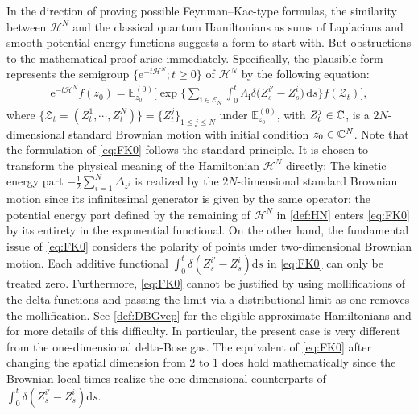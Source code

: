 \documentclass[12pt, twoside]{article}
\numberwithin{figure}{section}
\newcommand{\e}{{\mathrm e}}
\newcommand{\1}{\mathds 1}
\newcommand{\ms}{\mathscr}
\newcommand{\E}{{\mathbb E}}
\newcommand{\mc}{\mathcal}
\renewcommand{\d}{{\mathrm d}}
\newcommand{\2}{{\mathbf 1}}
\newcommand{\bi}{\mathbf i}
\newcommand{\CN}{{\mathbb C}^{\it N}}
\begin{document}
In the direction of proving possible Feynman--Kac-type formulas, the similarity between $\ms H^N$ and the classical quantum Hamiltonians as sums of Laplacians and smooth potential energy functions suggests a form to start with. But obstructions to the mathematical proof arise immediately. Specifically, the  plausible form represents the semigroup $\{\e^{-t\ms H^N};t\geq 0\}$ of $\ms H^N$ by the following equation: 
\begin{align}\label{eq:FK0}
{
\e^{-t\ms H^N}f(z_0)\;\mbox{=}\;
{\mathbb E}^{(0)}_{z_{0}} \Biggl[\exp \Biggl\{ \sum
_{\bi\in \mc E_N} 
\int _{0}^{t}\Lambda_\bi \delta\bigl(Z^{i
\prime}_{s}-Z^{i}_{s}
\bigr)\,\mathrm{d}s \Biggr\}f(\ms Z_{t}) \Biggr],
}
\end{align}
where $\{\ms Z_t=(Z^1_t,\cdots,Z^N_t)\}=\{Z^j_t\}_{1\leq j\leq N}$ under $\E^{(0)}_{z_0}$, with $Z^j_t\in\Bbb C$, is a $2N$-dimensional standard Brownian motion with initial condition $z_0\in \CN$. Note that the formulation of \eqref{eq:FK0} follows the standard principle. It is chosen to transform the physical meaning of the Hamiltonian $\ms H^N$ directly: The kinetic energy part $ -\frac{1}{2}\sum_{i=1}^N\Delta_{z^i}$ is realized by the $2N$-dimensional standard Brownian motion since its infinitesimal generator is given by the same operator; the potential energy part defined by the remaining of $\ms H^N$ in \eqref{def:HN} enters \eqref{eq:FK0} by its entirety in the exponential functional. On the other hand, the fundamental issue of \eqref{eq:FK0} considers the polarity of points under two-dimensional Brownian motion. Each additive functional $\int_0^t \delta(Z^{i\prime}_s-Z^i_s)\d s$ in \eqref{eq:FK0} can  only be treated zero. Furthermore, \eqref{eq:FK0} cannot be justified by using mollifications of the delta functions and passing the limit via a distributional limit as one removes the mollification. See \eqref{def:DBGvep} for the eligible approximate Hamiltonians and \cite[pp.137--138]{C:DBG} for more details of this difficulty. In particular, the present case is very different from the one-dimensional delta-Bose gas. The equivalent of \eqref{eq:FK0} after changing the spatial dimension from $2$ to $1$ does hold mathematically \cite{BC:1D} since the Brownian local times realize the one-dimensional counterparts of $\int_0^t \delta(Z^{i\prime}_s-Z^i_s)\d s$.
\end{document}
